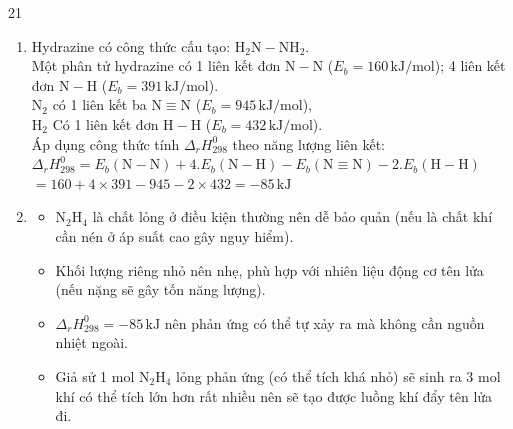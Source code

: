 \begin{loigiaibth}{21}
  \begin {enumerate} \item Hydrazine có công thức cấu tạo: $\mathrm {H_2N-NH_2}$. \\ Một phân tử hydrazine có 1 liên kết đơn $\mathrm {N-N}$ ($E_b = 160\,\mathrm {kJ/mol}$); 4 liên kết đơn $\mathrm {N-H}$ ($E_b = 391\,\mathrm {kJ/mol}$). \\ $\mathrm {N_2}$ có 1 liên kết ba $\mathrm {N\equiv N}$ ($E_b = 945\,\mathrm {kJ/mol}$), \\ $\mathrm {H_2}$ Có 1 liên kết đơn $\mathrm {H-H}$ ($E_b = 432\,\mathrm {kJ/mol}$). \\ Áp dụng công thức tính $\Delta _rH_{298}^0$ theo năng lượng liên kết: \\ $\Delta _rH_{298}^0 = E_b(\mathrm {N-N}) + 4.E_b(\mathrm {N-H}) - E_b(\mathrm {N\equiv N}) - 2.E_b(\mathrm {H-H})$ \\ $= 160 + 4 \times 391 - 945 - 2 \times 432 = - 85\,\mathrm {kJ}$ \item \begin {itemize} \item $\mathrm {N_2H_4}$ là chất lỏng ở điều kiện thường nên dễ bảo quản (nếu là chất khí cần nén ở áp suất cao gây nguy hiểm). \item Khối lượng riêng nhỏ nên nhẹ, phù hợp với nhiên liệu động cơ tên lửa (nếu nặng sẽ gây tốn năng lượng). \item $\Delta _rH_{298}^0 = - 85\,\mathrm {kJ}$ nên phản ứng có thể tự xảy ra mà không cần nguồn nhiệt ngoài. \item Giả sử 1 mol $\mathrm {N_2H_4}$ lỏng phản ứng (có thể tích khá nhỏ) sẽ sinh ra 3 mol khí có thể tích lớn hơn rất nhiều nên sẽ tạo được luồng khí đẩy tên lửa đi. \end {itemize} \end {enumerate}
\end{loigiaibth}
\def\writeANS{}
